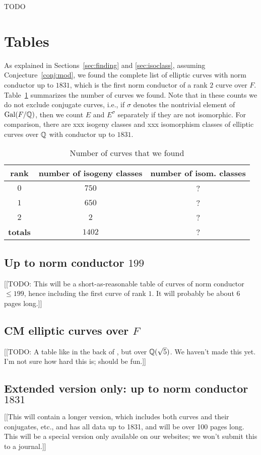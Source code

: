 \documentclass{amsart}
\begin{document}
TODO

\section{Tables}\label{sec:tables}

As explained in Sections~\ref{sec:finding} and \ref{sec:isoclass},
assuming Conjecture~\ref{conj:mod}, we found the complete list of
elliptic curves with norm conductor up to $1831$, which is the first
norm conductor of a rank $2$ curve over $F$.  Table~\ref{table:counts}
summarizes the number of curves we found.  Note that in these counts
we do not exclude conjugate curves, i.e., if $\sigma$ denotes the
nontrivial element of $\operatorname{Gal}(F/\mathbb{Q})$, then we count $E$ and $E^{\sigma}$
separately if they are not isomorphic.  For comparison, 
there are xxx isogeny classes and xxx isomorphism classes
of elliptic curves over $\mathbb{Q}$ with conductor up to $1831$.
\begin{center}
\begin{table}
\caption{Number of curves that we found\label{table:counts}}
\begin{tabular}{|c|c|c|}\hline
{\bf rank} & {\bf number of isogeny classes} & {\bf number of isom. classes} \\\hline
 $0$ & $750$ & ?\\\hline
 $1$ & $650$ & ?\\\hline
 $2$ & $2$ & ? \\\hline
{\bf totals} & $1402$ & ? \\\hline
\end{tabular}
\end{table}
\end{center}

\subsection{Up to norm conductor  $199$}\label{sec:to199}

[[TODO: This will be a short-as-reasonable table of curves of norm
conductor $\leq 199$, hence including the first curve of rank $1$.  It
will probably be about 6 pages long.]]

\subsection{CM elliptic curves over $F$}\label{sec:cm}

[[TODO: A table like in the back of \cite{silverman:aec2}, but over
$\mathbb{Q}(\sqrt{5})$.  We haven't made this yet.  I'm not sure how hard this
is; should be fun.]]

\subsection{Extended version only: up to norm conductor  $1831$}\label{sec:to1831}

[[This will contain a longer version, which includes both curves and
their conjugates, etc., and has all data up to 1831, and will be over
100 pages long.  This will be a special version only available on our
websites; we won't submit this to a journal.]]



 

\end{document}
